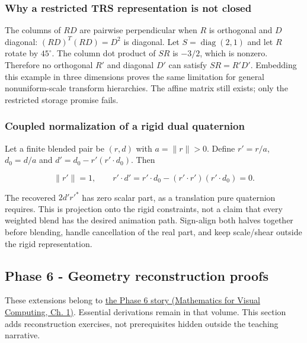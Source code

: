 \subsubsection{Why a restricted TRS representation is not closed}\label{02-foundations-ii-ch039-why-a-restricted-trs-representation-is-not-closed}

The columns of \(RD\) are pairwise perpendicular when \(R\) is orthogonal and \(D\) diagonal: \((RD)^T(RD)=D^2\) is diagonal. Let \(S=\operatorname{diag}(2,1)\) and let \(R\) rotate by \(45^\circ\). The column dot product of \(SR\) is \(-3/2\), which is nonzero. Therefore no orthogonal \(R'\) and diagonal \(D'\) can satisfy \(SR=R'D'\). Embedding this example in three dimensions proves the same limitation for general nonuniform-scale transform hierarchies. The affine matrix still exists; only the restricted storage promise fails.

\subsubsection{Coupled normalization of a rigid dual quaternion}\label{02-foundations-ii-ch039-coupled-normalization-of-a-rigid-dual-quaternion}

Let a finite blended pair be \((r,d)\) with \(a=\|r\|>0\). Define \(r'=r/a\), \(d_0=d/a\) and \(d'=d_0-r'(r'\cdot d_0)\). Then

\[
\|r'\|=1,\qquad r'\cdot d'=r'\cdot d_0-(r'\cdot r')(r'\cdot d_0)=0.
\]

The recovered \(2d'r'^*\) has zero scalar part, as a translation pure quaternion requires. This is projection onto the rigid constraints, not a claim that every weighted blend has the desired animation path. Sign-align both halves together before blending, handle cancellation of the real part, and keep scale/shear outside the rigid representation.

\subsection{Phase 6 - Geometry reconstruction proofs}\label{02-foundations-ii-ch039-phase-6---geometry-reconstruction-proofs}

These extensions belong to \href{../02-Mathematics-for-Visual-Computing/main.pdf\#nameddest=01-foundations-i-ch017-the-panel-gives-us-a-reason-to-learn}{the Phase 6 story (Mathematics for Visual Computing, Ch. 1)}. Essential derivations remain in that volume. This section adds reconstruction exercises, not prerequisites hidden outside the teaching narrative.

